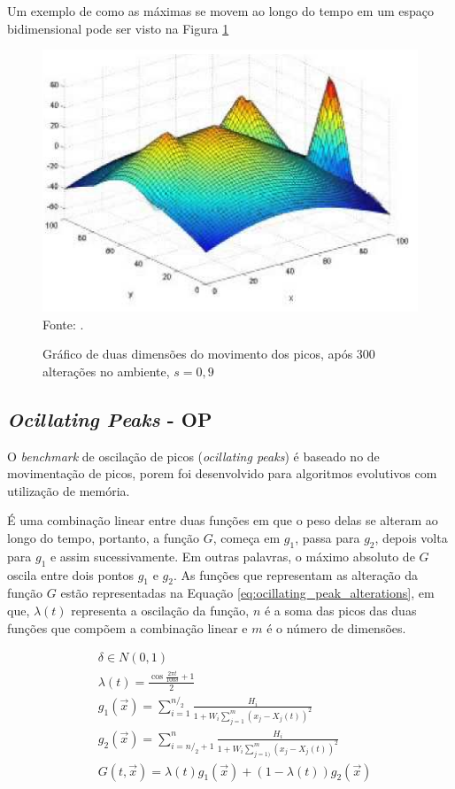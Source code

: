 Um exemplo de como as máximas se movem ao longo do tempo em um espaço bidimensional pode ser visto na Figura \ref{fig:moving_peaks}

\begin{figure}[!htb]
	\caption{Gráfico de duas dimensões do movimento dos picos, após 300 alterações no ambiente, $ s = 0,9 $}
	\centering
	\includegraphics[scale=0.5]{images/moving_peak.png}
	\label{fig:moving_peaks}{\\Fonte: .}
\end{figure}

\subsection{\textit{Ocillating Peaks} - OP}
\label{sec:ocillating_peaks}

O \textit{benchmark} de oscilação de picos (\textit{ocillating peaks}) é baseado no de movimentação de picos, porem foi desenvolvido para algoritmos evolutivos com utilização de memória.

É uma combinação linear entre duas funções em que o peso delas se alteram ao longo do tempo, portanto, a função $G$, começa em $g_1$, passa para $g_2$, depois volta para $g_1$ e assim sucessivamente. Em outras palavras, o máximo absoluto de $G$ oscila entre dois pontos $g_1$ e $g_2$. As funções que representam as alteração da função $G$ estão representadas na Equação \ref{eq:ocillating_peak_alterations}, em que, $\lambda (t)$ representa a oscilação da função, $n$ é a soma das picos das duas funções que compõem a combinação linear e $m$ é o número de dimensões.

\begin{equation}
\label{eq:ocillating_peak_alterations}
\begin{split}
& \delta \in N(0,1) \\
& \lambda (t) = \frac{\cos{\frac{2\pi t}{100\delta}} +1}{2} \\
& g_1(\vec{x}) = \sum_{i=1}^{n/_2} \frac{H_i}{1+W_i \sum_{j=1}^{m} (x_j - X_j(t))^2} \\
& g_2(\vec{x}) = \sum_{i=n/_2+1}^{n} \frac{H_i}{1+W_i \sum_{j=1)}^{m} (x_j - X_j(t))^2} \\
& G(t,\vec{x}) = \lambda (t) g_1(\vec{x}) + (1-\lambda (t))g_2(\vec{x})
\end{split}
\end{equation}

